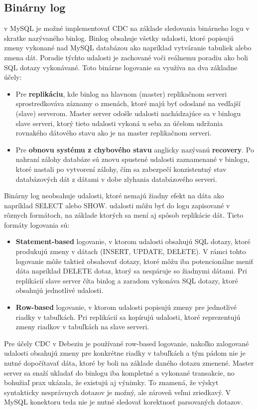 \subsection{Binárny log} \label{mysql:binlog}
v MySQL je možné implementovať CDC na základe sledovania binárneho logu v skratke nazývaného binlog\cite{mysql:reference_manual}. Binlog obsahuje všetky udalosti, ktoré popisujú zmeny vykonané nad MySQL databázou ako napríklad vytváranie tabuliek alebo zmena dát. Poradie týchto udalosti je zachované voči reálnemu poradiu ako boli SQL dotazy vykonávané. Toto binárne logovanie sa využíva na dva základne účely:
\begin{itemize}
\item Pre \textbf{replikáciu}, kde binlog na hlavnom (master) replikačnom serveri sprostredkováva záznamy o zmenách, ktoré majú byť odoslané na vedľajší (slave) serverom. Master server odošle udalosti nachádzajúce sa v binlogu slave serveri, ktorý tieto udalosti vykoná u seba za účelom udržania rovnakého dátového stavu ako je na master replikačnom serveri.
\item Pre \textbf{obnovu systému z chybového stavu} anglicky nazývanú \textbf{recovery}. Po  nahraní zálohy databáze sú znovu spustené udalosti zaznamenané v binlogu, ktoré nastali po vytvorení zálohy, čím sa zabezpečí konzistentný stav databázových dát z dátami v dobe zlyhania databázového serveri.
\end{itemize}

Binárny log neobsahuje udalosti, ktoré nemajú žiadny efekt na dáta ako napríklad  SELECT alebo SHOW. udalosti môžu byť do logu zapisované v rôznych formátoch, na základe ktorých sa mení aj spôsob replikácie dát. Tieto formáty logovania sú:
\begin{itemize}
\item \textbf{Statement-based} logovanie, v ktorom udalosti obsahujú SQL dotazy, ktoré produkujú zmeny v dátach (INSERT, UPDATE, DELETE). V rámci tohto logovanie môže taktiež obsahovať dotazy, ktoré môžu iba potencionálne meniť dáta napríklad DELETE dotaz, ktorý sa nespáruje so žiadnymi dátami. Pri replikácií slave server číta binlog a zaradom vykonáva SQL dotazy, ktoré obsahujú jednotlivé udalosti.
\item \textbf{Row-based} logovanie, v ktorom udalosti popisujú zmeny pre jednotlivé riadky v tabuľkách. Pri replikácií sa kopírujú udalosti, ktoré reprezentujú zmeny riadkov v tabuľkách na slave serveri. 
\end{itemize}

Pre účely CDC v Debeziu je používané row-based logovanie, nakoľko zalogované udalosti obsahujú zmeny pre konkrétne riadky v tabuľkách a tým pádom nie je nutné dopočítavať dáta, ktoré by boli na základe daného dotazu zmenené. Master server sa snaží ukladať do binlogu iba kompletné a vykonané transakcie, no bohužiaľ prax ukázala, že existujú aj výnimky. To znamená, že výskyt syntakticky nesprávnych dotazov je možný, ale zároveň veľmi zriedkavý. V MySQL konektoru teda nie je nutné sledovať korektnosť parsovaných dotazov.

